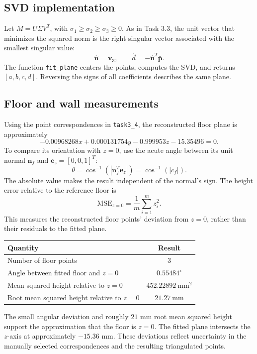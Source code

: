 \documentclass[11pt,letterpaper]{article}
\begin{document}
\subsection*{SVD implementation}
Let $M = U \Sigma V^T$, with $\sigma_1 \geq \sigma_2 \geq \sigma_3 \geq 0$. As in Task 3.3, the unit vector that minimizes the squared norm is the right singular vector associated with the smallest singular value:
\[
    \widehat{\mathbf{n}} = \mathbf{v}_3,
    \qquad
    \widehat d = -\widehat{\mathbf{n}}^T \bar{\mathbf{p}}.
\]
The function \texttt{fit\_plane} centers the points, computes the SVD, and returns $[a,b,c,d]$. Reversing the signs of all coefficients describes the same plane.

\clearpage

\subsection*{Floor and wall measurements}
Using the point correspondences in \texttt{task3\_4}, the reconstructed floor plane is approximately
\[
    -0.00968268x + 0.000131754y - 0.999953z - 15.35496 = 0.
\]
To compare its orientation with $z = 0$, use the acute angle between its unit normal $\mathbf{n}_f$ and $\mathbf{e}_z = [0,0,1]^T$:
\[
    \theta = \cos^{-1}\!\left(\left| \mathbf{n}_f^T \mathbf{e}_z\right|\right) = \cos^{-1}(|c_f|).
\]
The absolute value makes the result independent of the normal's sign. The height error relative to the reference floor is
\[
    \mathrm{MSE}_{z = 0} = \frac{1}{m} \sum_{i = 1}^{m}z_i^2.
\]
This measures the reconstructed floor points' deviation from $z = 0$, rather than their residuals to the fitted plane.

\begin{center}
\begin{tabular}{lc}
\toprule
Quantity & Result \\
\midrule
Number of floor points & 3 \\
Angle between fitted floor and $z = 0$ & $0.55484^\circ$ \\
Mean squared height relative to $z = 0$ & $452.22892\ \mathrm{mm}^2$ \\
Root mean squared height relative to $z = 0$ & $21.27\ \mathrm{mm}$ \\
\bottomrule
\end{tabular}
\end{center}

The small angular deviation and roughly $21$ mm root mean squared height support the approximation that the floor is $z = 0$. The fitted plane intersects the $z$-axis at approximately $-15.36$ mm. These deviations reflect uncertainty in the manually selected correspondences and the resulting triangulated points.
\end{document}

